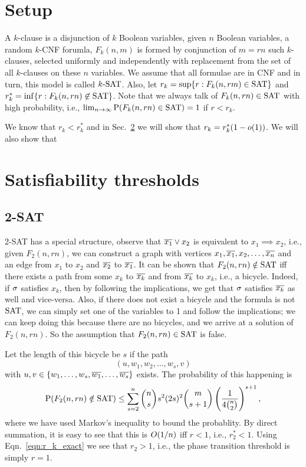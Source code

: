 \documentclass[letterpaper, 10pt, twocolumn, reqno]{amsart}
\begin{document}
\section{Setup}
\label{sec:setup}
A $k$-clause is a disjunction of $k$ Boolean variables, given $n$ Boolean
variables, a random $k$-CNF forumla, $F_k(n, m)$ is formed by conjunction of $m = rn$ such $k$-clauses, selected uniformly and independently with
replacement from the set of all $k$-clauses on these $n$ variables. We assume that all formulae are in CNF and in turn, this model is called $k\textrm{-SAT}$. Also,
let $r_k = \sup \{ r: F_k(n, rm) \in \textrm{SAT} \}$ and $r_k^* = \inf \{ r: F_k(n, rn) \not\in \textrm{SAT} \}$. Note that we always talk of $F_k(n,rn) \in \textrm{SAT}$ with high probability, i.e., $\lim_{n\to \infty} \textrm{P}(F_k(n,rn) \in \textrm{SAT}) = 1$ if $r < r_k$.

We know that $r_k < r_k^*$ and in Sec.~\ref{sec:sat_thresh}
we will show that $r_k = r_k^*(1-o(1))$. We will also show that

\section{Satisfiability thresholds}
\label{sec:sat_thresh}


\subsection{2-SAT}
\label{ssec:2sat}
2-SAT has a special structure, observe that $\overline{x_1} \vee x_2$ is equivalent to $x_1 \implies x_2$, i.e., given $F_2(n, rn)$, we can construct a graph with
vertices $x_1, \overline{x_1}, x_2, \ldots, \overline{x_n}$ and an edge from $x_1$ to $x_2$ and $\overline{x_2}$ to $\overline{x_1}$. It can be shown that $F_2(n,rn) \notin \textrm{SAT}$ iff
there exists a path from some $x_k$ to $\overline{x_k}$ and from $\overline{x_k}$ to $x_k$, i.e., a bicycle. Indeed, if $\sigma$ satisfies $x_k$, then by following the implications,
we get that $\sigma$ satisfies $\overline{x_k}$ as well and vice-versa. Also, if there does not exist a bicycle and the formula is not $\textrm{SAT}$, we can simply set one of the
variables to 1 and follow the implications; we can keep doing this because there are no bicycles, and we arrive at a solution of $F_2(n, rn)$. So the
assumption that $F_2(n,rn) \in \textrm{SAT}$ is false.

Let the length of this bicycle be $s$ if the path
$$(u, w_1, w_2, \ldots, w_s, v)$$
with $u,v \in \{w_1, \ldots, w_s,\overline{w_1}, \ldots, \overline{w_s}\}$
exists. The probability of this happening is
$$
\textrm{P}(F_2(n,rn) \notin \textrm{SAT}) \leq \sum_{s=2}^n \binom{n}{s} s^2 (2s)^2 \binom{m}{s+1} \left(\frac{1}{4 \binom{n}{2}}\right)^{s+1},
$$
where we have used Markov's inequality to bound the probablity. By direct summation, it is easy to see that this is $O(1/n)$ iff $r <1$, i.e., $r_2^* < 1$. Using Eqn.~\eqref{eqn:r_k_exact} we see that $r_2 > 1$, i.e., the phase transition threshold is simply $r = 1$.
\end{document}
